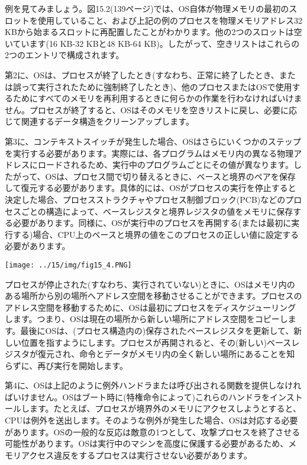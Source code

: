 例を見てみましょう。図15.2(139ページ)では、OS自体が物理メモリの最初のスロットを使用していること、および上記の例のプロセスを物理メモリアドレス32
KBから始まるスロットに再配置したことがわかります。他の2つのスロットは空いています(16
KB-32 KBと48 KB-64
KB)。したがって、空きリストはこれらの2つのエントリで構成されます。

第2に、OSは、プロセスが終了したとき(すなわち、正常に終了したとき、または誤って実行されたために強制終了したとき)、他のプロセスまたはOSで使用するためにすべてのメモリを再利用するときに何らかの作業を行わなければいけません。プロセスが終了すると、OSはそのメモリを空きリストに戻し、必要に応じて関連するデータ構造をクリーンアップします。

第3に、コンテキストスイッチが発生した場合、OSはさらにいくつかのステップを実行する必要があります。実際には、各プログラムはメモリ内の異なる物理アドレスにロードされるため、実行中のプログラムごとにその値が異なります。したがって、OSは、プロセス間で切り替えるときに、ベースと境界のペアを保存して復元する必要があります。具体的には、OSがプロセスの実行を停止すると決定した場合、プロセスストラクチャやプロセス制御ブロック(PCB)などのプロセスごとの構造によって、ベースレジスタと境界レジスタの値をメモリに保存する必要があります。同様に、OSが実行中のプロセスを再開する(または最初に実行する)場合、CPU上のベースと境界の値をこのプロセスの正しい値に設定する必要があります。

\texttt{[image: ../15/img/fig15\_4.PNG]}

プロセスが停止された(すなわち、実行されていない)ときに、OSはメモリ内のある場所から別の場所へアドレス空間を移動させることができます。プロセスのアドレス空間を移動するために、OSは最初にプロセスをディスケジューリングします。つまり、OSは現在の場所から新しい場所にアドレス空間をコピーします。最後にOSは、(プロセス構造内の)保存されたベースレジスタを更新して、新しい位置を指すようにします。プロセスが再開されると、その(新しい)ベースレジスタが復元され、命令とデータがメモリ内の全く新しい場所にあることを知らずに、再び実行を開始します。

第4に、OSは上記のように例外ハンドラまたは呼び出される関数を提供しなければいけません。OSはブート時に(特権命令によって)これらのハンドラをインストールします。たとえば、プロセスが境界外のメモリにアクセスしようとすると、CPUは例外を送出します。そのような例外が発生した場合、OSは対応する必要があります。OSの一般的な反応は敵意の1つとして、攻撃プロセスを終了させる可能性があります。OSは実行中のマシンを高度に保護する必要があるため、メモリアクセス違反をするプロセスは実行させない必要があります。

